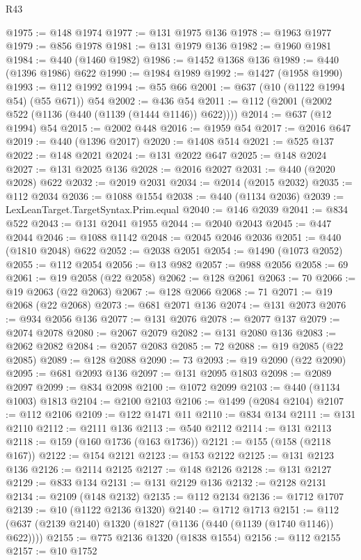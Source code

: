 \begin{lexlean}{R43}
\begin{coremodule}
@1975 := @148 @1974
@1977 := @131 @1975 @136
@1978 := @1963 @1977
@1979 := @856 @1978
@1981 := @131 @1979 @136
@1982 := @1960 @1981
@1984 := @440 (@1460 @1982)
@1986 := @1452 @1368 @136
@1989 := @440 (@1396 @1986) @622
@1990 := @1984 @1989
@1992 := @1427 (@1958 @1990)
@1993 := @112 @1992
@1994 := @55 @66
@2001 := @637 (@10 (@1122 @1994 @54) (@55 @671)) @54
@2002 := @436 @54
@2011 := @112 (@2001 (@2002 @522 (@1136 (@440 (@1139 (@1444 @1146)) @622))))
@2014 := @637 (@12 @1994) @54
@2015 := @2002 @448
@2016 := @1959 @54
@2017 := @2016 @647
@2019 := @440 (@1396 @2017)
@2020 := @1408 @514
@2021 := @525 @137
@2022 := @148 @2021
@2024 := @131 @2022 @647
@2025 := @148 @2024
@2027 := @131 @2025 @136
@2028 := @2016 @2027
@2031 := @440 (@2020 @2028) @622
@2032 := @2019 @2031
@2034 := @2014 (@2015 @2032)
@2035 := @112 @2034
@2036 := @1088 @1554
@2038 := @440 (@1134 @2036)
@2039 := LexLeanTarget.TargetSyntax.Prim.equal
@2040 := @146 @2039
@2041 := @834 @522
@2043 := @131 @2041 @1955
@2044 := @2040 @2043
@2045 := @447 @2044
@2046 := @1088 @1142
@2048 := @2045 @2046 @2036
@2051 := @440 (@1810 @2048) @622
@2052 := @2038 @2051
@2054 := @1490 (@1073 @2052)
@2055 := @112 @2054
@2056 := @13 @982
@2057 := @988 @2056
@2058 := 69
@2061 := @19 @2058 (@22 @2058)
@2062 := @128 @2061
@2063 := 70
@2066 := @19 @2063 (@22 @2063)
@2067 := @128 @2066
@2068 := 71
@2071 := @19 @2068 (@22 @2068)
@2073 := @681 @2071 @136
@2074 := @131 @2073
@2076 := @934 @2056 @136
@2077 := @131 @2076
@2078 := @2077 @137
@2079 := @2074 @2078
@2080 := @2067 @2079
@2082 := @131 @2080 @136
@2083 := @2062 @2082
@2084 := @2057 @2083
@2085 := 72
@2088 := @19 @2085 (@22 @2085)
@2089 := @128 @2088
@2090 := 73
@2093 := @19 @2090 (@22 @2090)
@2095 := @681 @2093 @136
@2097 := @131 @2095 @1803
@2098 := @2089 @2097
@2099 := @834 @2098
@2100 := @1072 @2099
@2103 := @440 (@1134 @1003) @1813
@2104 := @2100 @2103
@2106 := @1499 (@2084 @2104)
@2107 := @112 @2106
@2109 := @122 @1471 @11
@2110 := @834 @134
@2111 := @131 @2110
@2112 := @2111 @136
@2113 := @540 @2112
@2114 := @131 @2113
@2118 := @159 (@160 @1736 (@163 @1736))
@2121 := @155 (@158 (@2118 @167))
@2122 := @154 @2121
@2123 := @153 @2122
@2125 := @131 @2123 @136
@2126 := @2114 @2125
@2127 := @148 @2126
@2128 := @131 @2127
@2129 := @833 @134
@2131 := @131 @2129 @136
@2132 := @2128 @2131
@2134 := @2109 (@148 @2132)
@2135 := @112 @2134
@2136 := @1712 @1707
@2139 := @10 (@1122 @2136 @1320)
@2140 := @1712 @1713
@2151 := @112 (@637 (@2139 @2140) @1320 (@1827 (@1136 (@440 (@1139 (@1740 @1146)) @622))))
@2155 := @775 @2136 @1320 (@1838 @1554)
@2156 := @112 @2155
@2157 := @10 @1752

\end{coremodule}
\end{lexlean}
